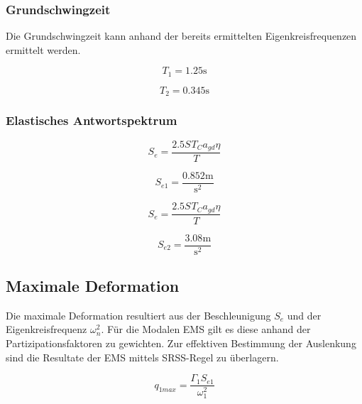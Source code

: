 \documentclass[
  letterpaper,
  DIV=11]{scrreprt}
\begin{document}
\hypertarget{grundschwingzeit-2}{%
\subsubsection{Grundschwingzeit}\label{grundschwingzeit-2}}

Die Grundschwingzeit kann anhand der bereits ermittelten
Eigenkreisfrequenzen ermittelt werden.

\begin{equation}T_{1} = 1.25 \text{s}\end{equation}

\begin{equation}T_{2} = 0.345 \text{s}\end{equation}

\hypertarget{elastisches-antwortspektrum-5}{%
\subsubsection{Elastisches
Antwortspektrum}\label{elastisches-antwortspektrum-5}}

\begin{equation}S_{e} = \frac{2.5 S_{} T_{C} a_{gd} \eta}{T}\end{equation}

\begin{equation}S_{e 1} = \frac{0.852 \text{m}}{\text{s}^{2}}\end{equation}

\begin{equation}S_{e} = \frac{2.5 S_{} T_{C} a_{gd} \eta}{T}\end{equation}

\begin{equation}S_{e 2} = \frac{3.08 \text{m}}{\text{s}^{2}}\end{equation}

\hypertarget{maximale-deformation-1}{%
\subsection{Maximale Deformation}\label{maximale-deformation-1}}

Die maximale Deformation resultiert aus der Beschleunigung \(S_e\) und
der Eigenkreisfrequenz \(\omega_n^2\). Für die Modalen EMS gilt es diese
anhand der Partizipationsfaktoren zu gewichten. Zur effektiven
Bestimmung der Auslenkung sind die Resultate der EMS mittels SRSS-Regel
zu überlagern.

\begin{equation}q_{1 max} = \frac{\Gamma_{1} S_{e 1}}{\omega_{1}^{2}}\end{equation}
\end{document}
